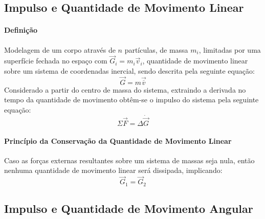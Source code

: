 \documentclass{article}
\begin{document}
        \subsection{Impulso e Quantidade de Movimento Linear}
            \paragraph{Definição}Modelagem de um corpo através de $n$ partículas, de massa $m_{i}$, limitadas por uma superfície fechada no espaço com $\vec{G}_{i} = m_{i} \vec{v}_{i}$, quantidade de movimento linear sobre um sistema de coordenadas inercial, sendo descrita pela seguinte equação:
                \begin{equation}
                    \boxed{
                        \vec{G} = m \vec{\overline{v}}
                    }
                \end{equation}
            Considerado a partir do centro de massa do sistema, extraindo a derivada no tempo da quantidade de movimento obtêm-se o impulso do sistema pela seguinte equação:
                \begin{equation}
                    \boxed{
                        \Sigma\vec{F} = \Delta\dot{\vec{G}}
                    }
                \end{equation}

            \paragraph{Princípio da Conservação da Quantidade de Movimento Linear}Caso as forças externas resultantes sobre um sistema de massas seja nula, então nenhuma quantidade de movimento linear será dissipada, implicando:
                \begin{equation}
                    \boxed{
                        \vec{G}_{1} = \vec{G}_{2}
                    }
                \end{equation}

        \subsection{Impulso e Quantidade de Movimento Angular}
\end{document}
